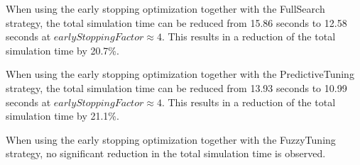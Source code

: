 \documentclass[conference]{IEEEtran}
\begin{document}
\begin{description}[style=nextline]
    \item[FullSearch (\autoref{fig:full_search})]
        When using the early stopping optimization together with the FullSearch strategy, the total simulation time
        can be reduced from 15.86 seconds to 12.58 seconds at $earlyStoppingFactor \approx4$. This results in a reduction of the total simulation time by 20.7\%.
    \item[PredictiveTuning (\autoref{fig:predictive_tuning})]
        When using the early stopping optimization together with the PredictiveTuning strategy, the total simulation time
        can be reduced from 13.93 seconds to 10.99 seconds at $earlyStoppingFactor \approx4$. This results in a reduction of the total simulation time by 21.1\%.
    \item[FuzzyTuning (\autoref{fig:fuzzy_tuning})]
        When using the early stopping optimization together with the FuzzyTuning strategy, no significant reduction in the total simulation time is observed.
\end{description}
\end{document}
